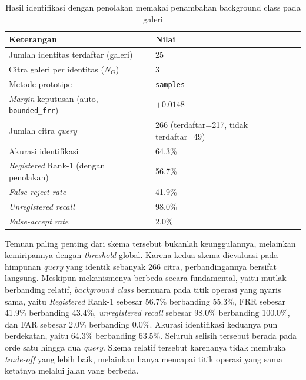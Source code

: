 \begin{table}[htbp]
    \centering
    \caption{Hasil identifikasi dengan penolakan memakai penambahan background class pada galeri}
    \label{tab:crossdataset_background_class}
    \renewcommand{\arraystretch}{1.25}
    \begin{tabular}{ll}
        \hline
        \textbf{Keterangan}                                     & \textbf{Nilai}                          \\
        \hline
        Jumlah identitas terdaftar (galeri)                     & 25                                      \\
        Citra galeri per identitas ($N_G$)                      & 3                                       \\
        Metode prototipe                                        & \texttt{samples}                        \\
        \textit{Margin} keputusan (auto, \texttt{bounded\_frr}) & $+0{.}0148$                             \\
        Jumlah citra \textit{query}                             & 266 (terdaftar=217, tidak terdaftar=49) \\
        Akurasi identifikasi                                    & 64.3\%                                  \\
        \textit{Registered} Rank-1 (dengan penolakan)           & 56.7\%                                  \\
        \textit{False-reject rate}                              & 41.9\%                                  \\
        \textit{Unregistered recall}                            & 98.0\%                                  \\
        \textit{False-accept rate}                              & 2.0\%                                   \\
        \hline
    \end{tabular}
\end{table}

Temuan paling penting dari skema tersebut bukanlah keunggulannya, melainkan kemiripannya
dengan \textit{threshold} global. Karena kedua skema dievaluasi pada himpunan
\textit{query} yang identik sebanyak 266 citra, perbandingannya bersifat langsung.
Meskipun mekanismenya berbeda secara fundamental, yaitu mutlak berbanding relatif,
\textit{background class} bermuara pada titik operasi yang nyaris sama, yaitu
\textit{Registered} Rank-1 sebesar 56.7\% berbanding 55.3\%, FRR sebesar 41.9\% berbanding
43.4\%, \textit{unregistered recall} sebesar 98.0\% berbanding 100.0\%, dan FAR sebesar
2.0\% berbanding 0.0\%. Akurasi identifikasi keduanya pun berdekatan, yaitu 64.3\%
berbanding 63.5\%. Seluruh selisih tersebut berada pada orde satu hingga dua
\textit{query}. Skema relatif tersebut karenanya tidak membuka \textit{trade-off} yang
lebih baik, melainkan hanya mencapai titik operasi yang sama ketatnya melalui jalan yang
berbeda.


